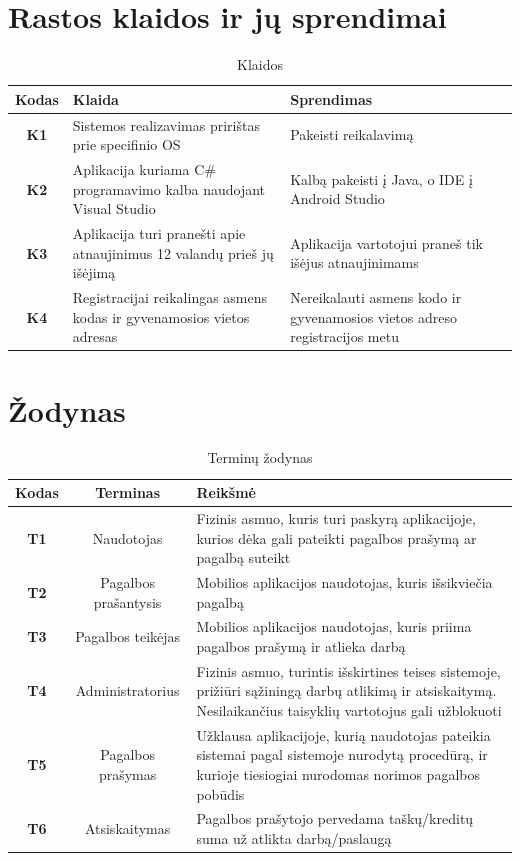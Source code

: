\documentclass{VUMIFPSbakalaurinis}
\begin{document}
\appendix
\section{Rastos klaidos ir jų sprendimai}
\begin{table}[H]\footnotesize
	\centering
	\caption{Klaidos}
	{
	\setlength{\arrayrulewidth}{0.25mm}
	{\begin{tabular}{|c|m{5.75cm}|m{5.75cm}|} \hline
		Kodas & Klaida & Sprendimas \\
		\hline
		\textbf{K1} & Sistemos realizavimas pririštas prie specifinio OS & Pakeisti reikalavimą \\
		\textbf{K2} & Aplikacija kuriama C\# programavimo kalba naudojant Visual Studio & Kalbą pakeisti į Java, o IDE į Android Studio \\
		\textbf{K3} & Aplikacija turi pranešti apie atnaujinimus 12 valandų prieš jų išėjimą & Aplikacija vartotojui praneš tik išėjus atnaujinimams \\
		\textbf{K4} & Registracijai reikalingas asmens kodas ir gyvenamosios vietos adresas & Nereikalauti asmens kodo ir gyvenamosios vietos adreso registracijos metu \\
		\hline
	\end{tabular}}
	}
	\label{tab:table example}
\end{table}

\section{Žodynas}
\begin{table}[H]\footnotesize
	\centering
	\caption{Terminų žodynas}
	{
	\setlength{\arrayrulewidth}{0.25mm}
	{\begin{tabular}{|c|c|m{11.5cm}|} \hline
		Kodas & Terminas & Reikšmė \\
		\hline
		\textbf{T1} & Naudotojas & Fizinis asmuo, kuris turi paskyrą aplikacijoje, kurios dėka gali pateikti pagalbos prašymą ar pagalbą suteikt \\
		\textbf{T2} & Pagalbos prašantysis & Mobilios aplikacijos naudotojas, kuris išsikviečia pagalbą \\
		\textbf{T3} & Pagalbos teikėjas & Mobilios aplikacijos naudotojas, kuris  priima pagalbos prašymą ir atlieka darbą \\
		\textbf{T4} & Administratorius & Fizinis asmuo, turintis išskirtines teises sistemoje, prižiūri sąžiningą darbų atlikimą ir atsiskaitymą. Nesilaikančius taisyklių vartotojus gali užblokuoti \\
		\textbf{T5} & Pagalbos prašymas & Užklausa aplikacijoje, kurią naudotojas pateikia sistemai pagal sistemoje nurodytą procedūrą, ir kurioje tiesiogiai nurodomas norimos pagalbos pobūdis \\
		\textbf{T6} & Atsiskaitymas & Pagalbos prašytojo pervedama taškų/kreditų suma už atlikta darbą/paslaugą \\
		\hline
	\end{tabular}}
	}
	\label{tab:table example}
\end{table}
	
\end{document}
